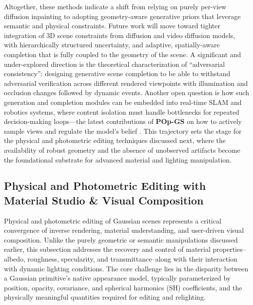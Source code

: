 \documentclass[11pt,a4paper]{article}
\begin{document}
Altogether, these methods indicate a shift from relying on purely per-view diffusion inpainting to adopting geometry-aware generative priors that leverage semantic and physical constraints. Future work will move toward tighter integration of 3D scene constraints from diffusion and video diffusion models, with hierarchically structured uncertainty, and adaptive, spatially-aware completion that is fully coupled to the geometry of the scene. A significant and under-explored direction is the theoretical characterization of ``adversarial consistency'': designing generative scene completion to be able to withstand adversarial verification across different rendered viewpoints with illumination and occlusion changes followed by dynamic events. Another open question is how such generation and completion modules can be embedded into real-time SLAM and robotics systems, where content isolation must handle bottlenecks for repeated decision-making loops---the latest contributions of \textbf{POp-GS} on how to actively sample views and regulate the model's belief \cite{arxiv:2503.07819v2}. This trajectory sets the stage for the physical and photometric editing techniques discussed next, where the availability of robust geometry and the absence of unobserved artifacts become the foundational substrate for advanced material and lighting manipulation.


\subsection{Physical and Photometric Editing with Material Studio \& Visual Composition}


Physical and photometric editing of Gaussian scenes represents a critical convergence of inverse rendering, material understanding, and user-driven visual composition. Unlike the purely geometric or semantic manipulations discussed earlier, this subsection addresses the recovery and control of material properties--albedo, roughness, specularity, and transmittance--along with their interaction with dynamic lighting conditions. The core challenge lies in the disparity between a Gaussian primitive's native appearance model, typically parameterized by position, opacity, covariance, and spherical harmonics (SH) coefficients, and the physically meaningful quantities required for editing and relighting.
\end{document}
